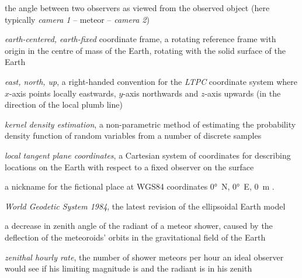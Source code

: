 \begin{description}[labelindent=0mm, leftmargin=40mm]
    \item[convergence angle]
        the angle between two observers as viewed from the observed object (here typically \emph{camera 1} -- meteor -- \emph{camera 2})
    \item[ECEF]
        \emph{earth-centered, earth-fixed} coordinate frame, a rotating reference frame with origin
        in the centre of mass of the Earth, rotating with the solid surface of the Earth
    \item[ENU]
        \emph{east, north, up}, a right-handed convention for the \emph{LTPC} coordinate system where
        $x$-axis points locally eastwards, $y$-axis northwards and $z$-axis upwards
        (in the direction of the local plumb line)
    \item[KDE]
        \emph{kernel density estimation}, a non-parametric method of estimating the probability density function
        of random variables from a number of discrete samples
    \item[LTPC]
        \emph{local tangent plane coordinates}, a Cartesian system of coordinates
        for describing locations on the Earth with respect to a fixed observer on the surface
    \item[Null Island]
        a nickname for the fictional place at WGS84 coordinates \ang{0}~N, \ang{0}~E, \SI{0}{\metre} \citep{null-island}.
    \item[WGS84]
        \emph{World Geodetic System 1984}, the latest revision of the ellipsoidal Earth model \citep{nima-wgs84}
    \item[zenith attraction]
        a decrease in zenith angle of the radiant of a meteor shower, caused by the deflection of the meteoroids' orbits in the
        gravitational field of the Earth \citep{lovell1954}
    \item[ZHR]
        \emph{zenithal hourly rate}, the number of shower meteors per hour an ideal observer would see
            if his limiting magnitude is  and the radiant is in his zenith \citep{imo-glossary}
\end{description}
